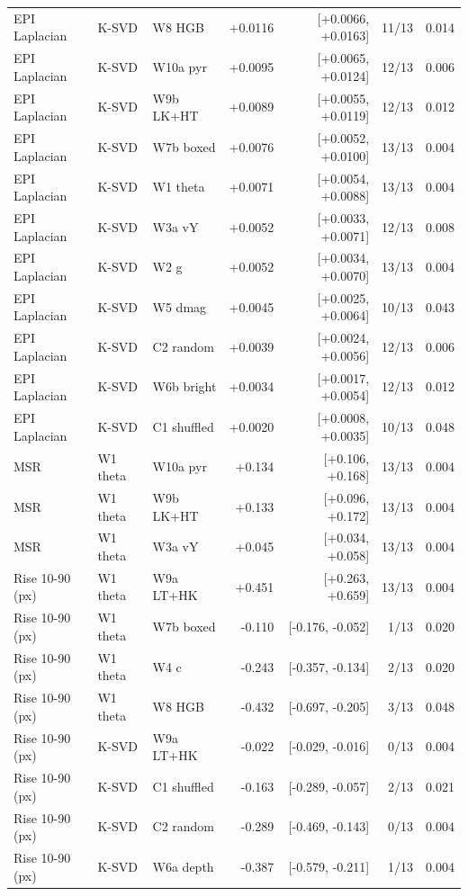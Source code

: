 \begin{tabular}{lllrrrr}
EPI Laplacian & K-SVD & W8 HGB & +0.0116 & [+0.0066, +0.0163] & 11/13 & 0.014 \\
EPI Laplacian & K-SVD & W10a pyr & +0.0095 & [+0.0065, +0.0124] & 12/13 & 0.006 \\
EPI Laplacian & K-SVD & W9b LK+HT & +0.0089 & [+0.0055, +0.0119] & 12/13 & 0.012 \\
EPI Laplacian & K-SVD & W7b boxed & +0.0076 & [+0.0052, +0.0100] & 13/13 & 0.004 \\
EPI Laplacian & K-SVD & W1 theta & +0.0071 & [+0.0054, +0.0088] & 13/13 & 0.004 \\
EPI Laplacian & K-SVD & W3a vY & +0.0052 & [+0.0033, +0.0071] & 12/13 & 0.008 \\
EPI Laplacian & K-SVD & W2 g & +0.0052 & [+0.0034, +0.0070] & 13/13 & 0.004 \\
EPI Laplacian & K-SVD & W5 dmag & +0.0045 & [+0.0025, +0.0064] & 10/13 & 0.043 \\
EPI Laplacian & K-SVD & C2 random & +0.0039 & [+0.0024, +0.0056] & 12/13 & 0.006 \\
EPI Laplacian & K-SVD & W6b bright & +0.0034 & [+0.0017, +0.0054] & 12/13 & 0.012 \\
EPI Laplacian & K-SVD & C1 shuffled & +0.0020 & [+0.0008, +0.0035] & 10/13 & 0.048 \\
MSR & W1 theta & W10a pyr & +0.134 & [+0.106, +0.168] & 13/13 & 0.004 \\
MSR & W1 theta & W9b LK+HT & +0.133 & [+0.096, +0.172] & 13/13 & 0.004 \\
MSR & W1 theta & W3a vY & +0.045 & [+0.034, +0.058] & 13/13 & 0.004 \\
Rise 10-90 (px) & W1 theta & W9a LT+HK & +0.451 & [+0.263, +0.659] & 13/13 & 0.004 \\
Rise 10-90 (px) & W1 theta & W7b boxed & -0.110 & [-0.176, -0.052] & 1/13 & 0.020 \\
Rise 10-90 (px) & W1 theta & W4 c & -0.243 & [-0.357, -0.134] & 2/13 & 0.020 \\
Rise 10-90 (px) & W1 theta & W8 HGB & -0.432 & [-0.697, -0.205] & 3/13 & 0.048 \\
Rise 10-90 (px) & K-SVD & W9a LT+HK & -0.022 & [-0.029, -0.016] & 0/13 & 0.004 \\
Rise 10-90 (px) & K-SVD & C1 shuffled & -0.163 & [-0.289, -0.057] & 2/13 & 0.021 \\
Rise 10-90 (px) & K-SVD & C2 random & -0.289 & [-0.469, -0.143] & 0/13 & 0.004 \\
Rise 10-90 (px) & K-SVD & W6a depth & -0.387 & [-0.579, -0.211] & 1/13 & 0.004 \\

\end{tabular}
